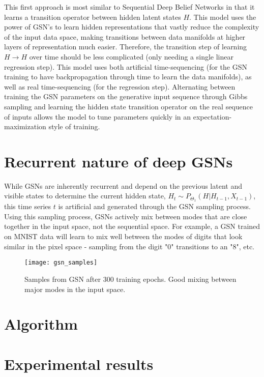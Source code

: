 This first approach is most similar to Sequential Deep Belief Networks in that it learns a transition operator between hidden latent states \(H\). This model uses the power of GSN's to learn hidden representations that vastly reduce the complexity of the input data space, making transitions between data manifolds at higher layers of representation much easier. Therefore, the transition step of learning \(H \rightarrow H\) over time should be less complicated (only needing a single linear regression step). This model uses both artificial time-sequencing (for the GSN training to have backpropagation through time to learn the data manifolds), as well as real time-sequencing (for the regression step). Alternating between training the GSN parameters on the generative input sequence through Gibbs sampling and learning the hidden state transition operator on the real sequence of inputs allows the model to tune parameters quickly in an expectation-maximization style of training.



\section{Recurrent nature of deep GSNs}

While GSNs are inherently recurrent and depend on the previous latent and visible states to determine the current hidden state, \(H_{t} \sim P_{\Theta_1}(H|H_{t-1},X_{t-1})\), this time series \(t\) is artificial and generated through the GSN sampling process. Using this sampling process, GSNs actively mix between modes that are close together in the input space, not the sequential space. For example, a GSN trained on MNIST data will learn to mix well between the modes of digits that look similar in the pixel space - sampling from the digit "0" transitions to an "8", etc.

\begin{figure}[h!]
  \centering
    \texttt{[image: gsn\_samples]}
\caption{Samples from GSN after 300 training epochs. Good mixing between major modes in the input space.}
\end{figure}



\section{Algorithm}



\section{Experimental results}

